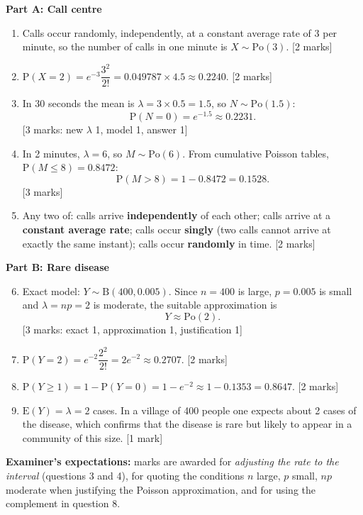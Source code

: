 \documentclass[11pt]{article}
\begin{document}
\begin{corrige}
\textbf{Part A: Call centre}
\begin{enumerate}
\item Calls occur randomly, independently, at a constant average rate of 3 per minute, so the number of calls in one minute is $X \sim \mathrm{Po}(3)$. \hfill [2 marks]
\item $\mathrm{P}(X = 2) = e^{-3}\dfrac{3^{2}}{2!} = 0.049787 \times 4.5 \approx 0.2240.$ \hfill [2 marks]
\item In 30 seconds the mean is $\lambda = 3 \times 0.5 = 1.5$, so $N \sim \mathrm{Po}(1.5)$:
\[ \mathrm{P}(N = 0) = e^{-1.5} \approx 0.2231. \] \hfill [3 marks: new $\lambda$ 1, model 1, answer 1]
\item In 2 minutes, $\lambda = 6$, so $M \sim \mathrm{Po}(6)$. From cumulative Poisson tables, $\mathrm{P}(M \le 8) = 0.8472$:
\[ \mathrm{P}(M > 8) = 1 - 0.8472 = 0.1528. \] \hfill [3 marks]
\item Any two of: calls arrive \textbf{independently} of each other; calls arrive at a \textbf{constant average rate}; calls occur \textbf{singly} (two calls cannot arrive at exactly the same instant); calls occur \textbf{randomly} in time. \hfill [2 marks]
\end{enumerate}
\textbf{Part B: Rare disease}
\begin{enumerate}
\setcounter{enumi}{5}
\item Exact model: $Y \sim \mathrm{B}(400, 0.005)$. Since $n = 400$ is large, $p = 0.005$ is small and $\lambda = np = 2$ is moderate, the suitable approximation is
\[ Y \approx \mathrm{Po}(2). \] \hfill [3 marks: exact 1, approximation 1, justification 1]
\item $\mathrm{P}(Y = 2) = e^{-2}\dfrac{2^{2}}{2!} = 2e^{-2} \approx 0.2707.$ \hfill [2 marks]
\item $\mathrm{P}(Y \ge 1) = 1 - \mathrm{P}(Y = 0) = 1 - e^{-2} \approx 1 - 0.1353 = 0.8647.$ \hfill [2 marks]
\item $\mathrm{E}(Y) = \lambda = 2$ cases. In a village of 400 people one expects about 2 cases of the disease, which confirms that the disease is rare but likely to appear in a community of this size. \hfill [1 mark]
\end{enumerate}
\textbf{Examiner's expectations:} marks are awarded for \emph{adjusting the rate to the interval} (questions 3 and 4), for quoting the conditions $n$ large, $p$ small, $np$ moderate when justifying the Poisson approximation, and for using the complement in question 8.
\end{corrige}
\end{document}

